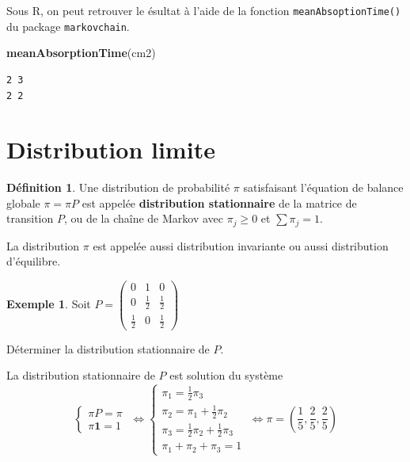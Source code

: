 \documentclass[
]{book}
\newenvironment{Shaded}{\begin{snugshade}}{\end{snugshade}}
\newcommand{\KeywordTok}[1]{\textcolor[rgb]{0.13,0.29,0.53}{\textbf{#1}}}
\newcommand{\NormalTok}[1]{#1}
\theoremstyle{definition}
\newtheorem{definition}{Définition}[chapter]
\theoremstyle{definition}
\newtheorem{example}{Exemple}[chapter]
\theoremstyle{definition}
\theoremstyle{remark}
\begin{document}
Sous R, on peut retrouver le ésultat à l'aide de la fonction \texttt{meanAbsoptionTime()} du package \texttt{markovchain}.

\begin{Shaded}
\begin{Highlighting}[]
\KeywordTok{meanAbsorptionTime}\NormalTok{(cm2)}
\end{Highlighting}
\end{Shaded}

\begin{verbatim}
2 3 
2 2 
\end{verbatim}

\hypertarget{distribution-limite}{%
\section{Distribution limite}\label{distribution-limite}}

\begin{definition}
\protect\hypertarget{def:unnamed-chunk-73}{}{\label{def:unnamed-chunk-73} }Une distribution de probabilité \(\pi\) satisfaisant l'équation de balance globale \(\pi =\pi P\) est appelée \textbf{distribution stationnaire} de la matrice de transition \(P\), ou de la chaîne de Markov avec \(\pi_j \geq 0\) et \(\sum \pi_j=1\).

La distribution \(\pi\) est appelée aussi distribution invariante ou aussi distribution d'équilibre.
\end{definition}

\begin{example}
\protect\hypertarget{exm:unnamed-chunk-74}{}{\label{exm:unnamed-chunk-74} }Soit \(P=\left(\begin{array}{ccc}  0 & 1 & 0 \\ 0 & \frac{1}{2} & \frac{1}{2}\\ \frac{1}{2} & 0 & \frac{1}{2}  \end{array}\right)\)

Déterminer la distribution stationnaire de \(P\).
\end{example}

La distribution stationnaire de \(P\) est solution du système
\[\left\{\begin{array}{l}
\pi P =\pi\\
\pi \mathbf{1}=1
\end{array}
\right. \; \Longleftrightarrow 
\left\{\begin{array}{l}
\pi_1 =\frac{1}{2}\pi_3\\
\pi_2 =\pi_1+\frac{1}{2}\pi_2\\
\pi_3 =\frac{1}{2}\pi_2+\frac{1}{2}\pi_3\\
\pi_1+\pi_2+\pi_3=1
\end{array}
\right.\; \Longleftrightarrow \pi=\left(\frac{1}{5},\frac{2}{5},\frac{2}{5}\right)
\]
\end{document}
